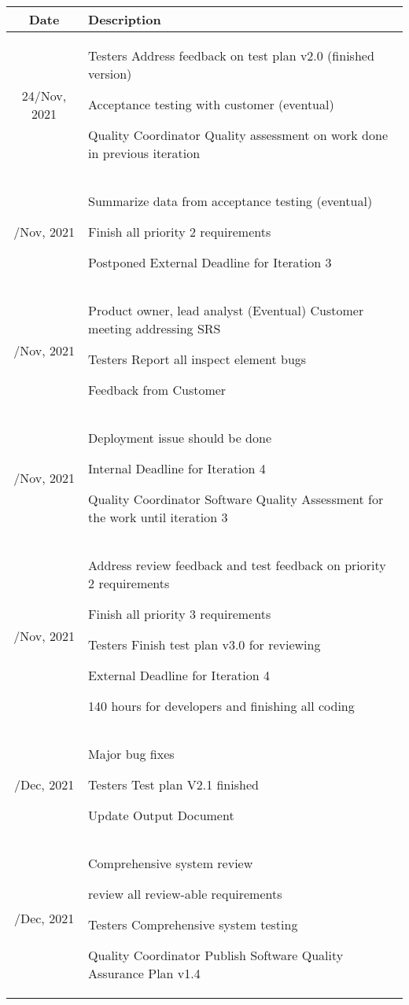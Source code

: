 \begin{table}[H]
\centering
\begin{tabular}{cp{9cm}}
    \toprule
    Date & Description \\
    \midrule
    24/Nov, 2021    
    & Testers Address feedback on test plan v2.0 (finished version)

    Acceptance testing with customer (eventual)

    Quality Coordinator Quality assessment on work done in previous iteration \\
    \addlinespace
    25/Nov, 2021
    & Summarize data from acceptance testing (eventual)

    Finish all priority 2 requirements

    Postponed External Deadline for Iteration 3 \\
    \addlinespace
    26/Nov, 2021
    & Product owner, lead analyst (Eventual) Customer meeting addressing SRS

    Testers Report all inspect element bugs

    Feedback from Customer \\
    \addlinespace
    29/Nov, 2021
    & Deployment issue should be done

    Internal Deadline for Iteration 4

    Quality Coordinator Software Quality Assessment for the work until iteration 3 \\
    \addlinespace
    30/Nov, 2021
    & Address review feedback and test feedback on priority 2 requirements

    Finish all priority 3 requirements

    Testers Finish test plan v3.0 for reviewing

    External Deadline for Iteration 4 
    
    140 hours for developers and finishing all coding \\
    \addlinespace
    01/Dec, 2021
    & Major bug fixes 

    Testers Test plan V2.1 finished

    Update Output Document  \\
    \addlinespace
    02/Dec, 2021
    & Comprehensive system review

    review all review-able requirements 
    
    Testers Comprehensive system testing
    
    Quality Coordinator Publish Software Quality Assurance Plan v1.4
    

\end{tabular}
\end{table}
